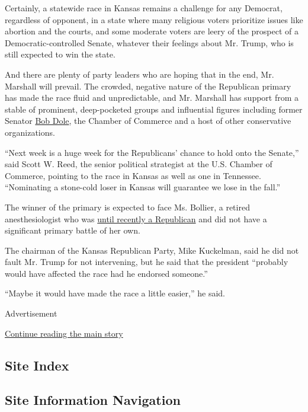 Certainly, a statewide race in Kansas remains a challenge for any
Democrat, regardless of opponent, in a state where many religious voters
prioritize issues like abortion and the courts, and some moderate voters
are leery of the prospect of a Democratic-controlled Senate, whatever
their feelings about Mr. Trump, who is still expected to win the state.

And there are plenty of party leaders who are hoping that in the end,
Mr. Marshall will prevail. The crowded, negative nature of the
Republican primary has made the race fluid and unpredictable, and Mr.
Marshall has support from a stable of prominent, deep-pocketed groups
and influential figures including former Senator
\href{https://www.kansascity.com/news/politics-government/article239180118.html}{Bob
Dole}, the Chamber of Commerce and a host of other conservative
organizations.

``Next week is a huge week for the Republicans' chance to hold onto the
Senate,'' said Scott W. Reed, the senior political strategist at the
U.S. Chamber of Commerce, pointing to the race in Kansas as well as one
in Tennessee. ``Nominating a stone-cold loser in Kansas will guarantee
we lose in the fall.''

The winner of the primary is expected to face Ms. Bollier, a retired
anesthesiologist who was
\href{https://www.kansas.com/news/politics-government/article222990385.html}{until
recently a Republican} and did not have a significant primary battle of
her own.

The chairman of the Kansas Republican Party, Mike Kuckelman, said he did
not fault Mr. Trump for not intervening, but he said that the president
``probably would have affected the race had he endorsed someone.''

``Maybe it would have made the race a little easier,'' he said.

Advertisement

\protect\hyperlink{after-bottom}{Continue reading the main story}

\hypertarget{site-index}{%
\subsection{Site Index}\label{site-index}}

\hypertarget{site-information-navigation}{%
\subsection{Site Information
Navigation}\label{site-information-navigation}}

